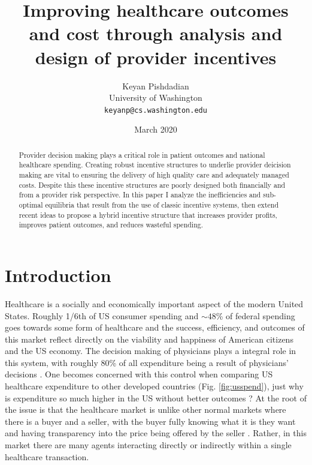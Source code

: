 \documentclass{article}
\begin{document}
\title{Improving healthcare outcomes and cost through analysis and design of provider incentives}
\author{Keyan Pishdadian\\University of Washington\\\texttt{keyanp@cs.washington.edu}}
\date{March 2020}

\maketitle

\begin{abstract}
Provider decision making plays a critical role in patient outcomes and national healthcare spending. Creating robust incentive structures to underlie provider deicision making are vital to ensuring the delivery of high quality care and adequately managed costs. Despite this these incentive structures are poorly designed both financially and from a provider risk perspective. In this paper I analyze the inefficiencies and sub-optimal equilibria that result from the use of classic incentive systems, then extend recent ideas to propose a hybrid incentive structure that increases provider profits, improves patient outcomes, and reduces wasteful spending.
\end{abstract}

\section{Introduction}
Healthcare is a socially and economically important aspect of the modern United States. Roughly 1/6th of US consumer spending \cite{econharvard} and ${\sim}48$\% of federal spending \cite{federalspend} goes towards some form of healthcare and the success, efficiency, and outcomes of this market reflect directly on the viability and happiness of American citizens and the US economy. The decision making of physicians plays a integral role in this system, with roughly 80\% of all expenditure being a result of physicians' decisions \cite{trust}. One becomes concerned with this control when comparing US healthcare expenditure to other developed countries (Fig. \ref{fig:usspend}), just why is expenditure so much higher in the US without better outcomes \cite{acoecon}? At the root of the issue is that the healthcare market is unlike other normal markets where there is a buyer and a seller, with the buyer fully knowing what it is they want and having transparency into the price being offered by the seller \cite{msdt}. Rather, in this market there are many agents interacting directly or indirectly within a single healthcare transaction.
\end{document}
